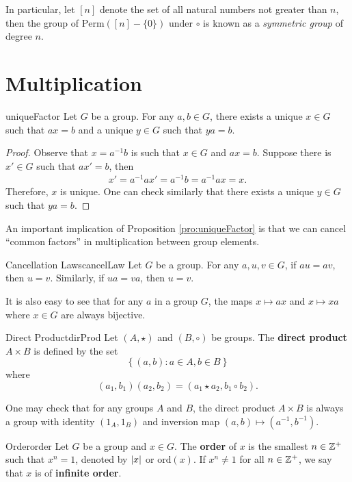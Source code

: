 \documentclass[math, code]{amznotes}
\theoremstyle{remark}
\begin{document}
In particular, let $[n]$ denote the set of all natural numbers not greater than $n$, then the group of $\mathrm{Perm}([n] - \{0\})$ under $\circ$ is known as a \textit{symmetric group} of degree $n$.

\section{Multiplication}
\begin{probox}{}{uniqueFactor}
    Let $G$ be a group. For any $a, b \in G$, there exists a unique $x \in G$ such that $ax = b$ and a unique $y \in G$ such that $ya = b$.
    \tcblower
    \begin{proof}
        Observe that $x = a^{-1}b$ is such that $x \in G$ and $ax = b$. Suppose there is $x' \in G$ such that $ax' = b$, then
        \begin{align*}
            x' = a^{-1}ax' = a^{-1}b = a^{-1}ax = x.
        \end{align*}
        Therefore, $x$ is unique. One can check similarly that there exists a unique $y \in G$ such that $ya = b$.
    \end{proof}
\end{probox}
An important implication of Proposition \ref{pro:uniqueFactor} is that we can cancel ``common factors'' in multiplication between group elements.
\begin{corbox}{Cancellation Laws}{cancelLaw}
    Let $G$ be a group. For any $a, u, v \in G$, if $au = av$, then $u = v$. Similarly, if $ua = va$, then $u = v$.
\end{corbox}
It is also easy to see that for any $a$ in a group $G$, the maps $x \mapsto ax$ and $x \mapsto xa$ where $x \in G$ are always bijective.
\begin{dfnbox}{Direct Product}{dirProd}
    Let $(A, \star)$ and $(B, \circ)$ be groups. The {\color{red} \textbf{direct product}} $A \times B$ is defined by the set
    \begin{equation*}
        \left\{(a, b) \colon a \in A, b \in B\right\}
    \end{equation*}
    where
    \begin{equation*}
        (a_1, b_1)(a_2, b_2) = (a_1 \star a_2, b_1 \circ b_2).
    \end{equation*}
\end{dfnbox}
One may check that for  any groups $A$ and $B$, the direct product $A \times B$ is always a group with identity $(1_A, 1_B)$ and inversion map $(a, b) \mapsto (a^{-1}, b^{-1})$.
\begin{dfnbox}{Order}{order}
    Let $G$ be a group and $x \in G$. The {\color{red} \textbf{order}} of $x$ is the smallest $n \in \mathbb{Z}^+$ such that $x^n = 1$, denoted by ${\left\lvert {x} \right\rvert}$ or $\mathrm{ord}(x)$. If $x^n \neq 1$ for all $n \in \mathbb{Z}^+$, we say that $x$ is of {\color{red} \textbf{infinite order}}.
\end{dfnbox}
\end{document}
